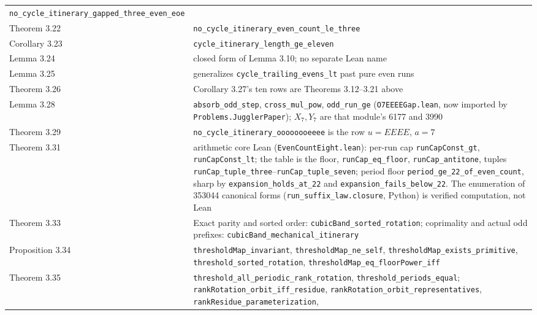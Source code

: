 \documentclass[12pt]{article}
\begin{document}
\begin{longtable}[]{@{}
  >{\raggedright\arraybackslash}p{}
  >{\raggedright\arraybackslash}p{}@{}}
\texttt{\nolinkurl{no_cycle_itinerary_gapped_three_even_eoe}} \\
Theorem 3.22 &
\texttt{\nolinkurl{no_cycle_itinerary_even_count_le_three}} \\
Corollary 3.23 &
\texttt{\nolinkurl{cycle_itinerary_length_ge_eleven}} \\
Lemma 3.24 & closed form of Lemma 3.10; no separate Lean name \\
Lemma 3.25 & generalizes \texttt{\nolinkurl{cycle_trailing_evens_lt}}
past pure even runs \\
Theorem 3.26 & Corollary 3.27's ten rows are Theorems 3.12--3.21
above \\
Lemma 3.28 & \texttt{\nolinkurl{absorb_odd_step}},
\texttt{\nolinkurl{cross_mul_pow}}, \texttt{\nolinkurl{odd_run_ge}}
(\texttt{\nolinkurl{O7EEEEGap.lean}}, now imported by
\texttt{\nolinkurl{Problems.JugglerPaper}}); \(X_7,Y_7\) are that
module's 6177 and 3990 \\
Theorem 3.29 & \texttt{\nolinkurl{no_cycle_itinerary_oooooooeeee}} is
the row \(u=EEEE\), \(a=7\) \\
Theorem 3.31 & arithmetic core Lean
(\texttt{\nolinkurl{EvenCountEight.lean}}): per-run cap
\texttt{\nolinkurl{runCapConst_gt}},
\texttt{\nolinkurl{runCapConst_lt}}; the table is the floor,
\texttt{\nolinkurl{runCap_eq_floor}},
\texttt{\nolinkurl{runCap_antitone}}, tuples
\texttt{\nolinkurl{runCap_tuple_three}}--\texttt{\nolinkurl{runCap_tuple_seven}};
period floor \texttt{\nolinkurl{period_ge_22_of_even_count}}, sharp by
\texttt{\nolinkurl{expansion_holds_at_22}} and
\texttt{\nolinkurl{expansion_fails_below_22}}. The enumeration of 353044
canonical forms (\texttt{\nolinkurl{run_suffix_law.closure}}, Python) is
verified computation, not Lean \\
Theorem 3.33 & Exact parity and sorted order:
\texttt{\nolinkurl{cubicBand_sorted_rotation}}; coprimality and actual
odd prefixes: \texttt{\nolinkurl{cubicBand_mechanical_itinerary}} \\
Proposition 3.34 & \texttt{\nolinkurl{thresholdMap_invariant}},
\texttt{\nolinkurl{thresholdMap_ne_self}},
\texttt{\nolinkurl{thresholdMap_exists_primitive}},
\texttt{\nolinkurl{threshold_sorted_rotation}},
\texttt{\nolinkurl{thresholdMap_eq_floorPower_iff}} \\
Theorem 3.35 &
\texttt{\nolinkurl{threshold_all_periodic_rank_rotation}},
\texttt{\nolinkurl{threshold_periods_equal}};
\texttt{\nolinkurl{rankRotation_orbit_iff_residue}},
\texttt{\nolinkurl{rankRotation_orbit_representatives}},
\texttt{\nolinkurl{rankResidue_parameterization}},

\end{longtable}
\end{document}
